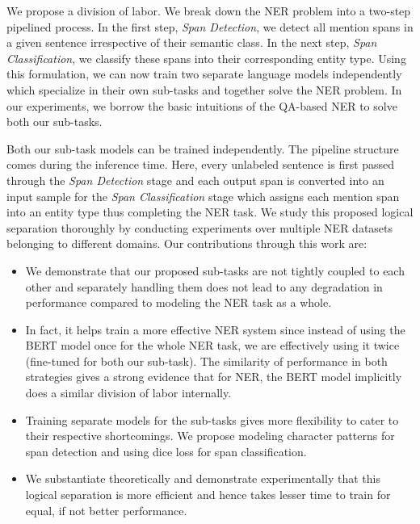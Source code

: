 We propose a division of labor. We break down the NER problem into a two-step pipelined process. In the first step, \textit{Span Detection}, we detect all mention spans in a given sentence irrespective of their semantic class. In the next step, \textit{Span Classification}, we classify these spans into their corresponding entity type. Using this formulation, we can now train two separate language models independently which specialize in their own sub-tasks and together solve the NER problem. In our experiments, we borrow the basic intuitions of the QA-based NER to solve both our sub-tasks.

Both our sub-task models can be trained independently. The pipeline structure comes during the inference time. Here, every unlabeled sentence is first passed through the \textit{Span Detection} stage and each output span is converted into an input sample for the \textit{Span Classification} stage which assigns each mention span into an entity type thus completing the NER task. We study this proposed logical separation thoroughly by conducting experiments over multiple NER datasets belonging to different domains. Our contributions through this work are:

\begin{itemize}
    \item We demonstrate that our proposed sub-tasks are not tightly coupled to each other and separately handling them does not lead to any degradation in performance compared to modeling the NER task as a whole. 
    
    \item In fact, it helps train a more effective NER system since instead of using the BERT model once for the whole NER task, we are effectively using it twice (fine-tuned for both our sub-task). The similarity of performance in both strategies gives a strong evidence that for NER, the BERT model implicitly does a similar division of labor internally.
    
    \item Training separate models for the sub-tasks gives more flexibility to cater to their respective shortcomings. We propose modeling character patterns for span detection and using dice loss for span classification.
    
    \item We substantiate theoretically and demonstrate experimentally that this logical separation is more efficient and hence takes lesser time to train for equal, if not better performance.
\end{itemize}

